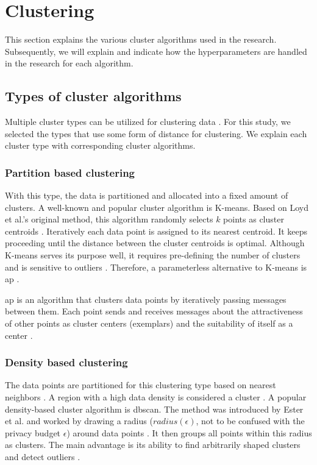 \section{Clustering}
This section explains the various cluster algorithms used in the research.
Subsequently, we will explain and indicate how the hyperparameters are handled in the research for each algorithm.
\subsection{Types of cluster algorithms}
Multiple cluster types can be utilized for clustering data \citep{xu_comprehensive_2015}.
For this study, we selected the types that use some form of distance for clustering.
We explain each cluster type with corresponding cluster algorithms.
\subsubsection{Partition based clustering}
With this type, the data is partitioned and allocated into a fixed amount of clusters.
A well-known and popular cluster algorithm is K-means.
Based on Loyd et al.'s original method, this algorithm randomly selects $k$ points as cluster centroids \citep{1056489}.
Iteratively each data point is assigned to its nearest centroid.
It keeps proceeding until the distance between the cluster centroids is optimal.
Although K-means serves its purpose well, it requires pre-defining the number of clusters and is sensitive to outliers \citep{keller_balancing_2021}.
Therefore, a parameterless alternative to K-means is \gls{ap} \citep{frey_clustering_2007}.

\gls{ap} is an algorithm that clusters data points by iteratively passing messages between them.
Each point sends and receives messages about the attractiveness of other points as cluster centers (exemplars) and the suitability of itself as a center \citep{keller_balancing_2021}.

\subsubsection{Density based clustering}
The data points are partitioned for this clustering type based on nearest neighbors \citep{fahad_survey_2014}.
A region with a high data density is considered a cluster \citep{xu_comprehensive_2015}.
A popular density-based cluster algorithm is \gls{dbscan}.
The method was introduced by Ester et al. and worked by drawing a radius ($radius(\epsilon)$, not to be confused with the privacy budget $\epsilon$) around data points \citep{ester_density-based_nodate}.
It then groups all points within this radius as clusters.
The main advantage is its ability to find arbitrarily shaped clusters and detect outliers \citep{liu_privacy_2012}.

